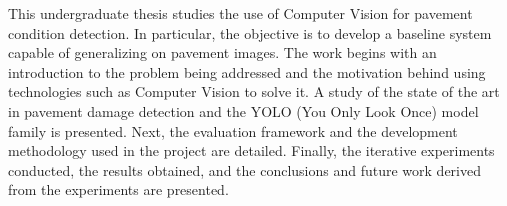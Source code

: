 
This undergraduate thesis studies the use of Computer Vision for pavement condition detection. In particular, the objective is to develop a baseline system capable of generalizing on pavement images. The work begins with an introduction to the problem being addressed and the motivation behind using technologies such as Computer Vision to solve it. A study of the state of the art in pavement damage detection and the YOLO (You Only Look Once) model family is presented. Next, the evaluation framework and the development methodology used in the project are detailed. Finally, the iterative experiments conducted, the results obtained, and the conclusions and future work derived from the experiments are presented.

